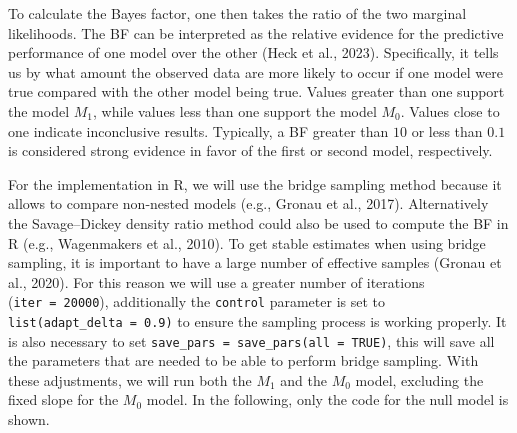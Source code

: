 \documentclass[
  doc,12pt,floatsintext]{apa7}
\newenvironment{Shaded}{\begin{snugshade}}{\end{snugshade}}
\newcommand{\AttributeTok}[1]{\textcolor[rgb]{0.13,0.29,0.53}{#1}}
\newcommand{\CommentTok}[1]{\textcolor[rgb]{0.56,0.35,0.01}{\textit{#1}}}
\newcommand{\ConstantTok}[1]{\textcolor[rgb]{0.56,0.35,0.01}{#1}}
\newcommand{\DecValTok}[1]{\textcolor[rgb]{0.00,0.00,0.81}{#1}}
\newcommand{\FloatTok}[1]{\textcolor[rgb]{0.00,0.00,0.81}{#1}}
\newcommand{\FunctionTok}[1]{\textcolor[rgb]{0.13,0.29,0.53}{\textbf{#1}}}
\newcommand{\NormalTok}[1]{#1}
\newcommand{\OtherTok}[1]{\textcolor[rgb]{0.56,0.35,0.01}{#1}}
\newcommand{\SpecialCharTok}[1]{\textcolor[rgb]{0.81,0.36,0.00}{\textbf{#1}}}
\newcommand{\StringTok}[1]{\textcolor[rgb]{0.31,0.60,0.02}{#1}}
\begin{document}
To calculate the Bayes factor, one then takes the ratio of the two marginal likelihoods. The BF can be interpreted as the relative evidence for the predictive performance of one model over the other (Heck et al., 2023). Specifically, it tells us by what amount the observed data are more likely to occur if one model were true compared with the other model being true. Values greater than one support the model \(M_1\), while values less than one support the model \(M_0\). Values close to one indicate inconclusive results. Typically, a BF greater than \(10\) or less than \(0.1\) is considered strong evidence in favor of the first or second model, respectively.

For the implementation in R, we will use the bridge sampling method because it allows to compare non-nested models (e.g., Gronau et al., 2017). Alternatively the Savage--Dickey density ratio method could also be used to compute the BF in R (e.g., Wagenmakers et al., 2010). To get stable estimates when using bridge sampling, it is important to have a large number of effective samples (Gronau et al., 2020). For this reason we will use a greater number of iterations (\texttt{iter\ =\ 20000}), additionally the \texttt{control} parameter is set to \texttt{list(adapt\_delta\ =\ 0.9)} to ensure the sampling process is working properly. It is also necessary to set \texttt{save\_pars\ =\ save\_pars(all\ =\ TRUE)}, this will save all the parameters that are needed to be able to perform bridge sampling. With these adjustments, we will run both the \(M_1\) and the \(M_0\) model, excluding the fixed slope for the \(M_0\) model. In the following, only the code for the null model is shown.

\begin{Shaded}
\end{Shaded}
\end{document}
